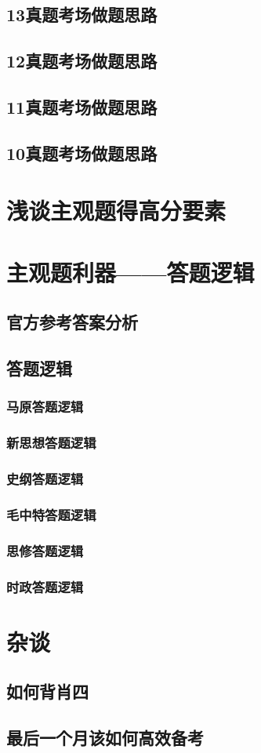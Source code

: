 \documentclass[lang=cn,newtx,10pt,scheme=chinese,pad,twocol]{zznote}
\begin{document}
\section{13真题考场做题思路}
\section{12真题考场做题思路}
\section{11真题考场做题思路}
\section{10真题考场做题思路}

\chapter{浅谈主观题得高分要素}





\chapter{主观题利器——答题逻辑}

\section{官方参考答案分析}



\section{答题逻辑}

\subsection{马原答题逻辑}
\subsection{新思想答题逻辑}
\subsection{史纲答题逻辑}
\subsection{毛中特答题逻辑}
\subsection{思修答题逻辑}
\subsection{时政答题逻辑}

\chapter{杂谈}
\section{如何背肖四}
\section{最后一个月该如何高效备考}
\end{document}
